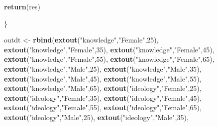 \documentclass[
]{article}
\newenvironment{Shaded}{\begin{snugshade}}{\end{snugshade}}
\newcommand{\DecValTok}[1]{\textcolor[rgb]{0.00,0.00,0.81}{#1}}
\newcommand{\KeywordTok}[1]{\textcolor[rgb]{0.13,0.29,0.53}{\textbf{#1}}}
\newcommand{\NormalTok}[1]{#1}
\newcommand{\StringTok}[1]{\textcolor[rgb]{0.31,0.60,0.02}{#1}}
\begin{document}
\begin{Shaded}
\begin{Highlighting}[]
  \KeywordTok{return}\NormalTok{(res)}
  
\NormalTok{\}}

\NormalTok{outdt <-}\StringTok{ }\KeywordTok{rbind}\NormalTok{(}\KeywordTok{extout}\NormalTok{(}\StringTok{"knowledge"}\NormalTok{,}\StringTok{"Female"}\NormalTok{,}\DecValTok{25}\NormalTok{),}
               \KeywordTok{extout}\NormalTok{(}\StringTok{"knowledge"}\NormalTok{,}\StringTok{"Female"}\NormalTok{,}\DecValTok{35}\NormalTok{),}
               \KeywordTok{extout}\NormalTok{(}\StringTok{"knowledge"}\NormalTok{,}\StringTok{"Female"}\NormalTok{,}\DecValTok{45}\NormalTok{),}
               \KeywordTok{extout}\NormalTok{(}\StringTok{"knowledge"}\NormalTok{,}\StringTok{"Female"}\NormalTok{,}\DecValTok{55}\NormalTok{),}
               \KeywordTok{extout}\NormalTok{(}\StringTok{"knowledge"}\NormalTok{,}\StringTok{"Female"}\NormalTok{,}\DecValTok{65}\NormalTok{),}
               \KeywordTok{extout}\NormalTok{(}\StringTok{"knowledge"}\NormalTok{,}\StringTok{"Male"}\NormalTok{,}\DecValTok{25}\NormalTok{),}
               \KeywordTok{extout}\NormalTok{(}\StringTok{"knowledge"}\NormalTok{,}\StringTok{"Male"}\NormalTok{,}\DecValTok{35}\NormalTok{),}
               \KeywordTok{extout}\NormalTok{(}\StringTok{"knowledge"}\NormalTok{,}\StringTok{"Male"}\NormalTok{,}\DecValTok{45}\NormalTok{),}
               \KeywordTok{extout}\NormalTok{(}\StringTok{"knowledge"}\NormalTok{,}\StringTok{"Male"}\NormalTok{,}\DecValTok{55}\NormalTok{),}
               \KeywordTok{extout}\NormalTok{(}\StringTok{"knowledge"}\NormalTok{,}\StringTok{"Male"}\NormalTok{,}\DecValTok{65}\NormalTok{),}
               \KeywordTok{extout}\NormalTok{(}\StringTok{"ideology"}\NormalTok{,}\StringTok{"Female"}\NormalTok{,}\DecValTok{25}\NormalTok{),}
               \KeywordTok{extout}\NormalTok{(}\StringTok{"ideology"}\NormalTok{,}\StringTok{"Female"}\NormalTok{,}\DecValTok{35}\NormalTok{),}
               \KeywordTok{extout}\NormalTok{(}\StringTok{"ideology"}\NormalTok{,}\StringTok{"Female"}\NormalTok{,}\DecValTok{45}\NormalTok{),}
               \KeywordTok{extout}\NormalTok{(}\StringTok{"ideology"}\NormalTok{,}\StringTok{"Female"}\NormalTok{,}\DecValTok{55}\NormalTok{),}
               \KeywordTok{extout}\NormalTok{(}\StringTok{"ideology"}\NormalTok{,}\StringTok{"Female"}\NormalTok{,}\DecValTok{65}\NormalTok{),}
               \KeywordTok{extout}\NormalTok{(}\StringTok{"ideology"}\NormalTok{,}\StringTok{"Male"}\NormalTok{,}\DecValTok{25}\NormalTok{),}
               \KeywordTok{extout}\NormalTok{(}\StringTok{"ideology"}\NormalTok{,}\StringTok{"Male"}\NormalTok{,}\DecValTok{35}\NormalTok{),}

\end{Highlighting}
\end{Shaded}
\end{document}
